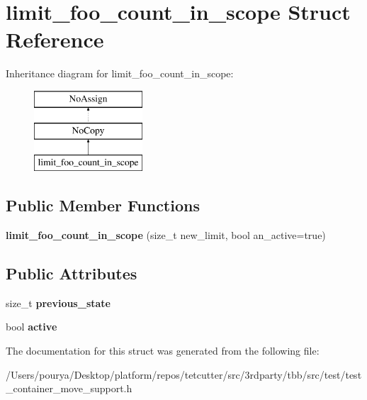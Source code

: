 \hypertarget{structlimit__foo__count__in__scope}{}\section{limit\+\_\+foo\+\_\+count\+\_\+in\+\_\+scope Struct Reference}
\label{structlimit__foo__count__in__scope}
Inheritance diagram for limit\+\_\+foo\+\_\+count\+\_\+in\+\_\+scope\+:\begin{figure}[H]
\begin{center}
\leavevmode
\includegraphics[height=3.000000cm]{structlimit__foo__count__in__scope}
\end{center}
\end{figure}
\subsection*{Public Member Functions}
\begin{DoxyCompactItemize}
\item 
\hypertarget{structlimit__foo__count__in__scope_ac1b6b6bb132155b272f016b6f88c17bd}{}{\bfseries limit\+\_\+foo\+\_\+count\+\_\+in\+\_\+scope} (size\+\_\+t new\+\_\+limit, bool an\+\_\+active=true)\label{structlimit__foo__count__in__scope_ac1b6b6bb132155b272f016b6f88c17bd}

\end{DoxyCompactItemize}
\subsection*{Public Attributes}
\begin{DoxyCompactItemize}
\item 
\hypertarget{structlimit__foo__count__in__scope_a4e189bd9599f84d1f95dccc38f1912fc}{}size\+\_\+t {\bfseries previous\+\_\+state}\label{structlimit__foo__count__in__scope_a4e189bd9599f84d1f95dccc38f1912fc}

\item 
\hypertarget{structlimit__foo__count__in__scope_a09afdada9a35d105ace131dc48a17806}{}bool {\bfseries active}\label{structlimit__foo__count__in__scope_a09afdada9a35d105ace131dc48a17806}

\end{DoxyCompactItemize}


The documentation for this struct was generated from the following file\+:\begin{DoxyCompactItemize}
\item 
/\+Users/pourya/\+Desktop/platform/repos/tetcutter/src/3rdparty/tbb/src/test/test\+\_\+container\+\_\+move\+\_\+support.\+h\end{DoxyCompactItemize}
